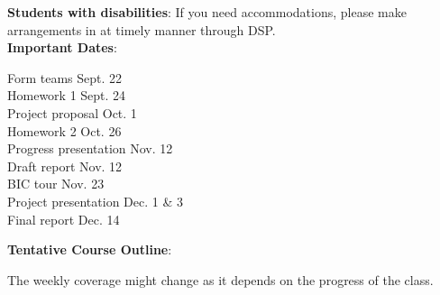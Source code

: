 \documentclass[11pt]{article}
\begin{document}
\textbf{Students with disabilities}: If you need accommodations, please make
arrangements in at timely manner through DSP.\\

\noindent\textbf{Important Dates}:
\begin{center} \begin{minipage}{5in}
\begin{flushleft}
Form teams \dotfill Sept. 22\\
Homework 1 \dotfill Sept. 24\\
Project proposal \dotfill Oct. 1\\
Homework 2 \dotfill Oct. 26\\
Progress presentation \dotfill Nov. 12\\
Draft report \dotfill Nov. 12\\
BIC tour \dotfill Nov. 23\\
Project presentation \dotfill Dec. 1 \& 3\\
Final report \dotfill Dec. 14\\
\end{flushleft}
\end{minipage}
\end{center}

\newpage

\textbf {\large Tentative Course Outline}:

The weekly coverage might change as it depends on the progress of the class.
\end{document}
